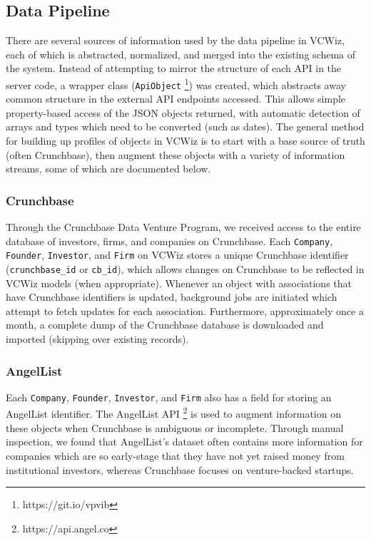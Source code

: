\subsection{Data Pipeline}
\label{ch4:data}

There are several sources of information used by the data pipeline in VCWiz, each of which is abstracted, normalized, and merged into the existing schema of the system.  Instead of attempting to mirror the structure of each API in the server code, a wrapper class (\texttt{ApiObject} \footnote{https://git.io/vpvib}) was created, which abstracts away common structure in the external API endpoints accessed. This allows simple property-based access of the JSON objects returned, with automatic detection of arrays and types which need to be converted (such as dates). The general method for building up profiles of objects in VCWiz is to start with a base source of truth (often Crunchbase), then augment these objects with a variety of information streams, some of which are documented below.

\subsubsection{Crunchbase}

Through the Crunchbase Data Venture Program, we received access to the entire database of investors, firms, and companies on Crunchbase. Each \texttt{Company}, \texttt{Founder}, \texttt{Investor}, and \texttt{Firm} on VCWiz stores a unique Crunchbase identifier (\texttt{crunchbase\_id} or \texttt{cb\_id}), which allows changes on Crunchbase to be reflected in VCWiz models (when appropriate). Whenever an object with associations that have Crunchbase identifiers is updated, background jobs are initiated which attempt to fetch updates for each association. Furthermore, approximately once a month, a complete dump of the Crunchbase database is downloaded and imported (skipping over existing records).

\subsubsection{AngelList}

Each \texttt{Company}, \texttt{Founder}, \texttt{Investor}, and \texttt{Firm} also has a field for storing an AngelList identifier. The AngelList API \footnote{https://api.angel.co} is used to augment information on these objects when Crunchbase is ambiguous or incomplete. Through manual inspection, we found that AngelList's dataset often contains more information for companies which are so early-stage that they have not yet raised money from institutional investors, whereas Crunchbase focuses on venture-backed startups.

